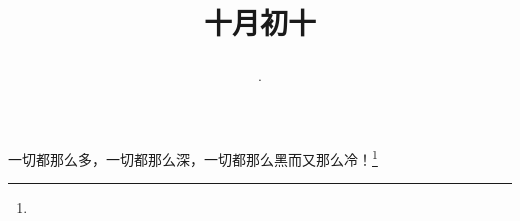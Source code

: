 \title{\date[d=10,m=11,y=2024][year:cn-y,年,month:cn,day:cn,日,·,weekday]·十月初十 }
一切都那么多，一切都那么深，一切都那么黑而又那么冷！\footnote{ }

